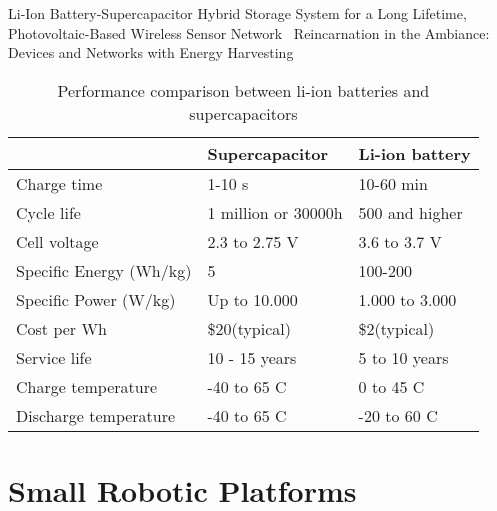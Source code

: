 Li-Ion Battery-Supercapacitor Hybrid Storage System for a Long Lifetime, Photovoltaic-Based Wireless Sensor Network~\cite{ongaro_pwre_2012}
Reincarnation in the Ambiance: Devices and Networks with Energy Harvesting \cite{prasad_comst_2014}



\begin{table}[t]
	\centering
	\begin{threeparttable}
		\caption{Performance comparison between li-ion batteries and supercapacitors}
		\label{tab:battery_vs_supercap}
		\small
		\begin{tabular}{|l|l|l|}
			\hline
			& Supercapacitor & Li-ion battery \\
			\hline \hline
			Charge time & 1-10 s & 10-60 min \\
			Cycle life & 1 million or 30000h & 500 and higher \\
			Cell voltage & 2.3 to 2.75 V & 3.6 to 3.7 V \\
			Specific Energy (Wh/kg) & 5 & 100-200 \\
			Specific Power (W/kg) & Up to 10.000 & 1.000 to 3.000 \\
			Cost per Wh & \$20(typical) & \$2(typical) \\
			Service life & 10 - 15 years & 5 to 10 years \\
			Charge temperature & -40 to 65 \textdegree C & 0 to 45 \textdegree C \\
			Discharge temperature & -40 to 65 \textdegree C & -20 to 60 \textdegree C \\
			\hline
		\end{tabular}
	\end{threeparttable}
\end{table}


\section{Small Robotic Platforms}
\label{sec:robotic_platforms}


